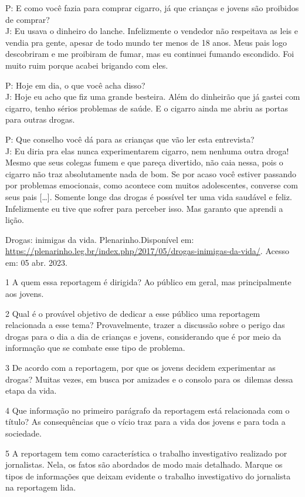\begin{itemize}
\begin{itemize}
{\begin{itemize}
\begin{itemize}
P: E como você fazia para comprar cigarro, já que crianças e jovens são
proibidos de comprar?\\
J: Eu usava o dinheiro do lanche. Infelizmente o vendedor não respeitava
as leis e vendia pra gente, apesar de todo mundo ter menos de 18 anos.
Meus pais logo descobriram e me proibiram de fumar, mas eu continuei
fumando escondido. Foi muito ruim porque acabei brigando com eles.

P: Hoje em dia, o que você acha disso?\\
J: Hoje eu acho que fiz uma grande besteira. Além do dinheirão que já
gastei com cigarro, tenho sérios problemas de saúde. E o cigarro ainda
me abriu as portas para outras drogas.

P: Que conselho você dá para as crianças que vão ler esta entrevista?\\
J: Eu diria pra elas nunca experimentarem cigarro, nem nenhuma outra
droga! Mesmo que seus colegas fumem e que pareça divertido, não caia
nessa, pois o cigarro não traz absolutamente nada de bom. Se por acaso
você estiver passando por problemas emocionais, como acontece com muitos
adolescentes, converse com seus pais {[}\ldots{}{]}. Somente longe das
drogas é possível ter uma vida saudável e feliz. Infelizmente eu tive
que sofrer para perceber isso. Mas garanto que aprendi a lição.

Drogas: inimigas da vida. Plenarinho.Disponível em:
\url{https://plenarinho.leg.br/index.php/2017/05/drogas-inimigas-da-vida/}.
Acesso em: 05 abr. 2023.

\num{1} A quem essa reportagem é dirigida?  Ao público em
geral, mas principalmente aos jovens.

\num{2} Qual é o provável objetivo de dedicar a esse público uma
reportagem relacionada a esse tema?  Provavelmente, trazer a
discussão sobre o perigo das drogas para o dia a dia de crianças e
jovens, considerando que é por meio da informação que se combate esse
tipo de problema.

\num{3} De acordo com a reportagem, por que os jovens decidem
experimentar as drogas?  Muitas vezes, em busca por amizades e
o consolo para os~dilemas dessa etapa da vida.

\num{4} Que informação no primeiro parágrafo da reportagem está
relacionada com o título?  As consequências que o vício traz
para a vida dos jovens e para toda a sociedade.

\num{5} A reportagem tem como característica o trabalho investigativo
realizado por jornalistas. Nela, os fatos são abordados de modo mais
detalhado. Marque os tipos de informações que deixam evidente o trabalho
investigativo do jornalista na reportagem lida.


\end{itemize}
\end{itemize}}
\end{itemize}
\end{itemize}
